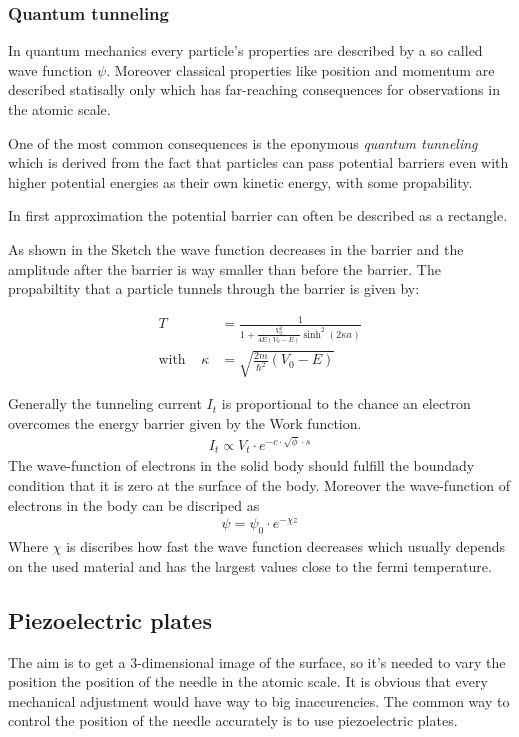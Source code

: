 \documentclass[a4paper, parskip=half]{scrartcl}
\begin{document}
\subsubsection{Quantum tunneling}
In quantum mechanics every particle's properties are described by a so called wave function $\psi$. Moreover classical properties like 
position and momentum are described statisally only which has far-reaching consequences for observations in the atomic scale.

One of the most common consequences is the eponymous \textit{quantum tunneling} which is derived from the fact that particles can
 pass potential barriers even with higher potential energies as their own kinetic energy, with some propability.

In first approximation the potential barrier can often be described as a rectangle.


As shown in the Sketch the wave function decreases in the barrier and the amplitude after the barrier is way smaller than before the barrier. The propabiltity that a particle tunnels through the barrier is given by:

\begin{align}
T &= \frac{1}{1 + \frac{V_0^2}{4E(V_0-E)}\sinh^2(2\kappa a)} \\
\text{with}\;\;\;\; \kappa &= \sqrt{\frac{2m}{\hbar^2}(V_0-E)}
\end{align}

Generally the tunneling current $I_t$ is proportional to the chance an electron overcomes the energy barrier given by the Work function.
\begin{align}
  I_t \propto V_t \cdot e^{-c \cdot \sqrt{\phi} \cdot s}
\end{align}
The wave-function of electrons in the solid body should fulfill the boundady condition that it is zero at the surface of the body. Moreover the wave-function of electrons in the body can be discriped as
\begin{align}
\psi = \psi_0 \cdot e^{-\chi z}
\end{align}
Where $\chi$ is discribes how fast the wave function decreases which usually depends on the used material and has the largest values close to the fermi temperature. 

\subsection{Piezoelectric plates}
The aim is to get a 3-dimensional image of the surface, so it's needed to vary the position the position of the needle in the atomic scale. It is obvious that every mechanical adjustment would have way to big inaccurencies. The common way to control the position of the needle accurately is to use piezoelectric plates.
\end{document}
